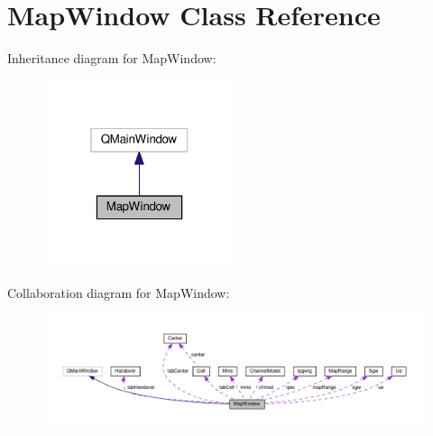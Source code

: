 \hypertarget{class_map_window}{}\section{Map\+Window Class Reference}
\label{class_map_window}


Inheritance diagram for Map\+Window\+:
\nopagebreak
\begin{figure}[H]
\begin{center}
\leavevmode
\includegraphics[width=160pt]{class_map_window__inherit__graph}
\end{center}
\end{figure}


Collaboration diagram for Map\+Window\+:
\nopagebreak
\begin{figure}[H]
\begin{center}
\leavevmode
\includegraphics[width=350pt]{class_map_window__coll__graph}
\end{center}
\end{figure}
